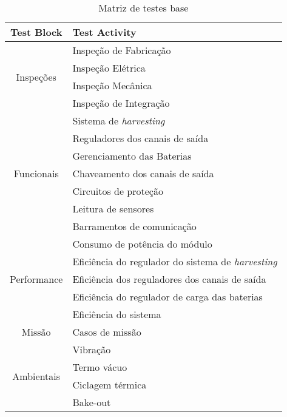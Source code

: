 \begin{table}
    \ABNTEXfontereduzida
    \centering
    \caption{Matriz de testes base}
    \begin{tabular}{cl}
        \toprule
        \textbf{Test Block} & \textbf{Test Activity} \\
        \midrule
        \midrule
        \multirow{4}{*}{Inspeções}      & Inspeção de Fabricação                \\
                                        & Inspeção Elétrica                     \\
                                        & Inspeção Mecânica                     \\
                                        & Inspeção de Integração                \\
        \midrule
        \multirow{7}{*}{Funcionais}     & Sistema de \textit{harvesting}        \\
                                        & Reguladores dos canais de saída       \\
                                        & Gerenciamento das Baterias    \\
                                        & Chaveamento dos canais de saída       \\
                                        & Circuitos de proteção                 \\
                                        & Leitura de sensores                   \\
                                        & Barramentos de comunicação            \\
        \midrule
        \multirow{5}{*}{Performance}    & Consumo de potência do módulo         \\
                                        & Eficiência do regulador do sistema de \textit{harvesting} \\
                                        & Eficiência dos reguladores dos canais de saída \\
                                        & Eficiência do regulador de carga das baterias \\
                                        & Eficiência do sistema                 \\
        \midrule
        Missão                          & Casos de missão                       \\
        \midrule
        \multirow{4}{*}{Ambientais}     & Vibração                              \\
                                        & Termo vácuo                           \\
                                        & Ciclagem térmica                      \\
                                        & Bake-out                              \\
        \bottomrule
    \end{tabular}
    \label{tab:matriz-base}
\end{table}



